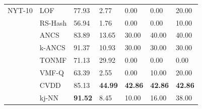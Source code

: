 \begin{table}
\begin{tabularx}{\columnwidth}{@{}XXXXXXX@{}}
NYT-10   & \gls{LOF}     & 77.93 & 	2.77 &	0.00 &	0.00 &	20.00 \\
         & \gls{RS-Hash} & 56.94 & 1.76  & 0.00  & 0.00  & 10.00 \\
         & \gls{ANCS}     & 83.89 & 13.65 & 30.00 & 40.00 & 40.00 \\
         & \gls{k-ANCS}   & 91.37 &	10.93 & 30.00 &	30.00 &	30.00 	 \\
         & \gls{TONMF}   & 71.13 & 29.92 &	0.00 &	0.00 &	0.00 \\
         & \gls{VMF-Q}   & 63.39 & 2.55  & 0.00  & 10.00 & 20.00 \\
         & \gls{CVDD}     & 85.13	& \bfseries44.99	& \bfseries42.86 &	\bfseries42.86	 & \bfseries42.86 \\
         & \gls{kj-NN}   & \bfseries 91.52 &	8.45 &	10.00 &	16.00 &	38.00 \\ \bottomrule
\end{tabularx}
\end{table}

